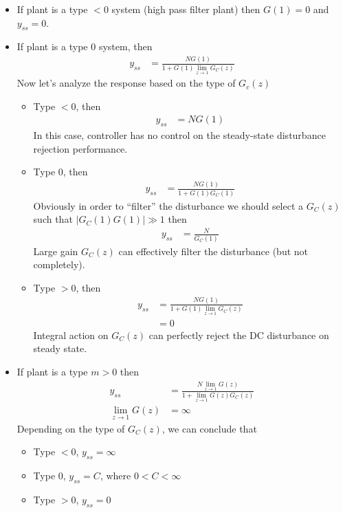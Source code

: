 \documentclass[twoside]{article}
\begin{document}
\begin{itemize}

  \item If plant is a type $< 0$ system (high pass filter plant)
    then $G(1) = 0$ and $y_{ss} = 0$. 

   \item If plant is a type $0$ system, then
%
\begin{align*}
y_{ss} &= \frac{N G(1)}{1 + G(1) \lim_{z\to1} G_C(z) }
\end{align*}
%
Now let's analyze the response based on the type of $G_c(z)$

\begin{itemize}

\item Type $< 0$, then 
%
\begin{align*}
y_{ss} &= N G(1)
\end{align*}
%
In this case, controller has no control
on the steady-state disturbance rejection
performance. 

\item Type $0$, then 
%
\begin{align*}
y_{ss} &= \frac{N G(1)}{1 + G(1) G_C(1) }
\end{align*}
%
Obviously in order to ``filter'' the disturbance 
we should select a $G_C(z)$ such that 
$| G_C(1) G(1) | \gg 1$ then
%
\begin{align*}
y_{ss} &= \frac{N}{G_C(1)}
\end{align*}
%
Large gain $G_C(z)$ can effectively filter the disturbance (but not completely). 

\item Type $> 0$, then 
%
\begin{align*}
y_{ss} &= \frac{N G(1)}{1 + G(1) \lim_{z\to1} G_C(z) }
\\
&= 0
\end{align*}
%
Integral action on $G_C(z)$ can perfectly 
reject the DC disturbance on steady state. 

\end{itemize}

\item If plant is a type $m > 0 $ then
%
\begin{align*}
y_{ss} &= \frac{N \lim_{z\to1} G(z)}{1 + \lim_{z\to1} G(z) G_C(z) } 
\\
\lim_{z\to1} G(z) &= \infty
\end{align*}
%
Depending on the type of $G_C(z)$, we can conclude that
%
\begin{itemize}
 \item Type $< 0$, $y_{ss} = \infty$
 \item Type $0$, $y_{ss} = C$, where $0 < C < \infty$
 \item Type $> 0$, $y_{ss} = 0$
\end{itemize}
%

\end{itemize}
\end{document}
